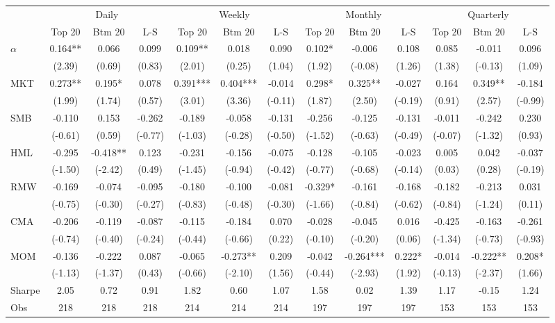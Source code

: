 \begin{tabular}{l*{12}{c}}
\toprule
 & \multicolumn{3}{c}{Daily} & \multicolumn{3}{c}{Weekly} & \multicolumn{3}{c}{Monthly} & \multicolumn{3}{c}{Quarterly} \\
\cmidrule(lr){2-4}\cmidrule(lr){5-7}\cmidrule(lr){8-10}\cmidrule(lr){11-13}
 & Top 20 & Btm 20 & L-S & Top 20 & Btm 20 & L-S & Top 20 & Btm 20 & L-S & Top 20 & Btm 20 & L-S \\
\midrule
$\alpha$ & 0.164** & 0.066 & 0.099 & 0.109** & 0.018 & 0.090 & 0.102* & -0.006 & 0.108 & 0.085 & -0.011 & 0.096 \\
 & (2.39) & (0.69) & (0.83) & (2.01) & (0.25) & (1.04) & (1.92) & (-0.08) & (1.26) & (1.38) & (-0.13) & (1.09) \\
MKT & 0.273** & 0.195* & 0.078 & 0.391*** & 0.404*** & -0.014 & 0.298* & 0.325** & -0.027 & 0.164 & 0.349** & -0.184 \\
 & (1.99) & (1.74) & (0.57) & (3.01) & (3.36) & (-0.11) & (1.87) & (2.50) & (-0.19) & (0.91) & (2.57) & (-0.99) \\
SMB & -0.110 & 0.153 & -0.262 & -0.189 & -0.058 & -0.131 & -0.256 & -0.125 & -0.131 & -0.011 & -0.242 & 0.230 \\
 & (-0.61) & (0.59) & (-0.77) & (-1.03) & (-0.28) & (-0.50) & (-1.52) & (-0.63) & (-0.49) & (-0.07) & (-1.32) & (0.93) \\
HML & -0.295 & -0.418** & 0.123 & -0.231 & -0.156 & -0.075 & -0.128 & -0.105 & -0.023 & 0.005 & 0.042 & -0.037 \\
 & (-1.50) & (-2.42) & (0.49) & (-1.45) & (-0.94) & (-0.42) & (-0.77) & (-0.68) & (-0.14) & (0.03) & (0.28) & (-0.19) \\
RMW & -0.169 & -0.074 & -0.095 & -0.180 & -0.100 & -0.081 & -0.329* & -0.161 & -0.168 & -0.182 & -0.213 & 0.031 \\
 & (-0.75) & (-0.30) & (-0.27) & (-0.83) & (-0.48) & (-0.30) & (-1.66) & (-0.84) & (-0.62) & (-0.84) & (-1.24) & (0.11) \\
CMA & -0.206 & -0.119 & -0.087 & -0.115 & -0.184 & 0.070 & -0.028 & -0.045 & 0.016 & -0.425 & -0.163 & -0.261 \\
 & (-0.74) & (-0.40) & (-0.24) & (-0.44) & (-0.66) & (0.22) & (-0.10) & (-0.20) & (0.06) & (-1.34) & (-0.73) & (-0.93) \\
MOM & -0.136 & -0.222 & 0.087 & -0.065 & -0.273** & 0.209 & -0.042 & -0.264*** & 0.222* & -0.014 & -0.222** & 0.208* \\
 & (-1.13) & (-1.37) & (0.43) & (-0.66) & (-2.10) & (1.56) & (-0.44) & (-2.93) & (1.92) & (-0.13) & (-2.37) & (1.66) \\
Sharpe & 2.05 & 0.72 & 0.91 & 1.82 & 0.60 & 1.07 & 1.58 & 0.02 & 1.39 & 1.17 & -0.15 & 1.24 \\
Obs & 218 & 218 & 218 & 214 & 214 & 214 & 197 & 197 & 197 & 153 & 153 & 153 \\
\bottomrule
\end{tabular}